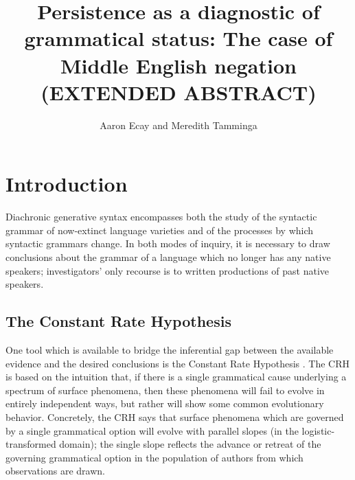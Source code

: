 \documentclass{article}
\title{Persistence as a diagnostic of grammatical status: The case of
    Middle English negation (EXTENDED ABSTRACT)}
\author{Aaron Ecay and Meredith Tamminga}
\begin{document}
\maketitle

\section{Introduction}
\label{sec:introduction}

Diachronic generative syntax encompasses both the study of the syntactic
grammar of now-extinct language varieties and of the processes by which
syntactic grammars change.  In both modes of inquiry, it is necessary to
draw conclusions about the grammar of a language which no longer has any
native speakers; investigators’ only recourse is to written productions
of past native speakers.

\subsection{The Constant Rate Hypothesis}
\label{sec:const-rate-hypoth}

One tool which is available to bridge the inferential gap between the
available evidence and the desired conclusions is the Constant Rate
Hypothesis \parencite[CRH][]{Kroch1989}.  The CRH is based on the
intuition that, if there is a single grammatical cause underlying
a spectrum of surface phenomena, then these phenomena will fail to
evolve in entirely independent ways, but rather will show some common
evolutionary behavior.  Concretely, the CRH says that surface phenomena
which are governed by a single grammatical option will evolve with
parallel slopes (in the logistic-transformed domain); the single slope
reflects the advance or retreat of the governing grammatical option in
the population of authors from which observations are drawn.

\end{document}

